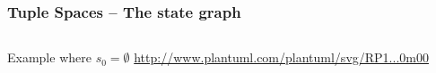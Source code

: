 \documentclass[handout]{beamer}\mode<presentation>{\usetheme{AMSCesenaBleu}}
\begin{document}
\begin{frame}
\frametitle{Tuple Spaces  -- The state graph}
    
    \begin{columns}
        \begin{column}{.75\linewidth}
            \begin{exampleblock}{Example where $s_0 = \emptyset$}
                \href{http://www.plantuml.com/plantuml/svg/RP1FJi905CRtSuhd2ZKXAGKs3K52mMYYa5XnWomczAaJfZFDp6iKZJjDN70HkOntu2IEJ6fgxAvvl-_FrnbOueQAJ3Ax4YhdXcSmmZjUI3hLYXBnZ1065PWG9zmZMai4GLoAfQrtJtY64El223JiGQG8cEMqXXJjqeYSX5QiuhG_qV3208PykRetkb1fhAKslTvCuLFklZ3jzs6DKkf7zihO_7W1pMOVRC2ysGOHx3xUcGtylHN1YIxea8vkrJo9pyQZsSLuKOeTtMq-QRVPCjloXZ22hpUdFPyauwlhNwKx4xEXrxYE0w5yPZoT9BDB5rd2q46JUZWTkf2R2coNSngrUnmcDt-xNzNOpsfxOwUkieJjkieITkj_g0D_7pMgT7f5zv_2RwC66w1AYqn-0m00}{http://www.plantuml.com/plantuml/svg/RP1...0m00}
            \end{exampleblock}
            
            \vfill
            

\end{column}
\end{columns}
\end{frame}
\end{document}
